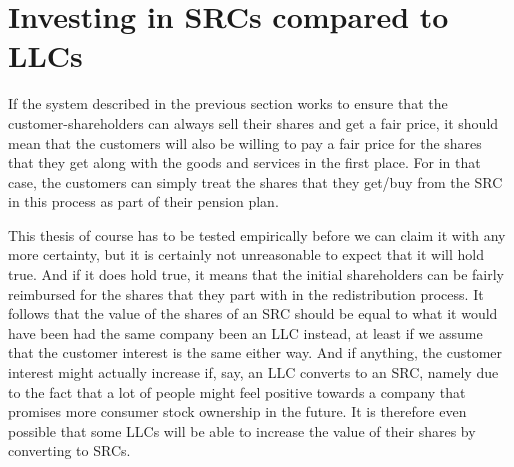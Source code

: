 \documentclass{article}
\begin{document}









\section{Investing in SRCs compared to LLCs}
\label{sect_thesis}

If the system described in the previous section works to ensure that the customer-shareholders can always sell their shares and get a fair price, it should mean that the customers will also be willing to pay a fair price for the shares that they get along with the goods and services in the first place. For in that case, the customers can simply treat the shares that they get/buy from the SRC in this process as part of their pension plan. 

This thesis of course has to be tested empirically before we can claim it with any more certainty, but it is certainly not unreasonable to expect that it will hold true.
%
And if it does hold true, it means that the initial shareholders can be fairly reimbursed for the shares that they part with in the redistribution process. It follows that the value of the shares of an SRC should be equal to what it would have been had the same company been an LLC instead, at least if we assume that the customer interest is the same either way. And if anything, the customer interest might actually increase if, say, an LLC converts to an SRC, namely due to the fact that a lot of people might feel positive towards a company that promises more consumer stock ownership in the future. It is therefore even possible that some LLCs will be able to increase the value of their shares by converting to SRCs.
\end{document}
